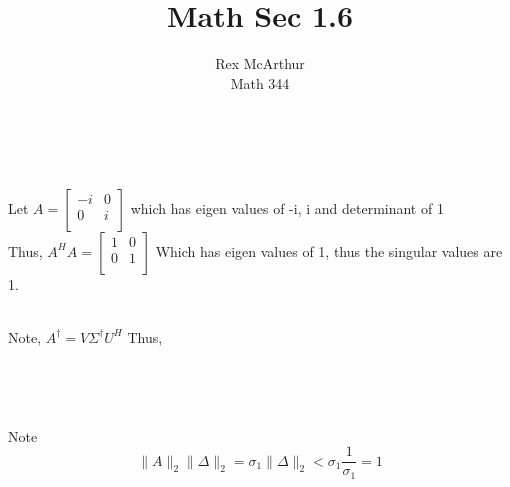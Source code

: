 \documentclass[letterpaper,12pt]{article}
\title{Math Sec 1.6}
\author{Rex McArthur\\Math 344}
\theoremstyle{definition}
\begin{document}
\maketitle
{}\\

\\
Let $A = \begin{bmatrix}-i & 0 \\
                0 & i \\
\end{bmatrix}$ which has eigen values of -i, i and determinant of 1\\
Thus, $A^HA = \begin{bmatrix}1 & 0 \\
                0 & 1 \\
\end{bmatrix}$ Which has eigen values of 1, thus the singular values are 1. 

\\
Note, $A^\dagger = V\Sigma^\dagger U^H$
Thus, 
\begin{align*}
    
\end{align*}


\\

\\

\\
Note
\[
    \|A\|_2 \|\Delta\|_2 = \sigma_1 \|\Delta\|_2 < \sigma_1 \frac{1}{\sigma_1} = 1
\]

\\
\end{document}
